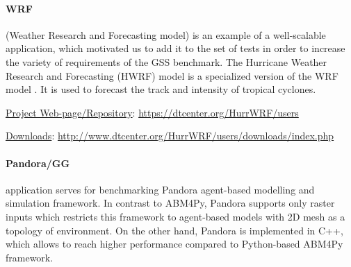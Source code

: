 \paragraph{WRF} (Weather Research and Forecasting model) is an example of a well-scalable application,
which motivated us to add it to the set of tests in order to increase the variety of requirements of the {GSS benchmark}. 
The Hurricane Weather Research and Forecasting (HWRF) model is a specialized version of the WRF model \cite{2018:hwrf}.
It is used to forecast the track and intensity of tropical cyclones.

\underline{Project Web-page/Repository}: \url{https://dtcenter.org/HurrWRF/users}

\underline{Downloads}: \url{http://www.dtcenter.org/HurrWRF/users/downloads/index.php}

\iffalse
\underline{Hurricane WRF software}

\fi

\paragraph{Pandora/GG} application serves for benchmarking \textsf{Pandora} agent-based modelling and simulation framework.
In contrast to \textsf{ABM4Py}, \textsf{Pandora} supports only raster inputs
which restricts this framework to agent-based models with 2D mesh as a topology of environment.
On the other hand, \textsf{Pandora} is implemented in C++,
which allows to reach higher performance compared to Python-based \textsf{ABM4Py} framework.

